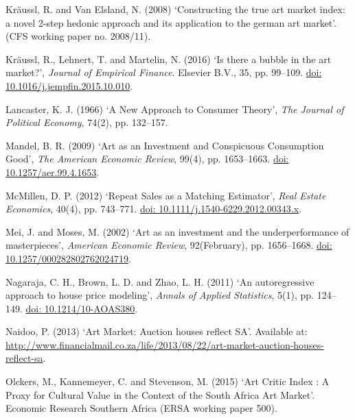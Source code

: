 \documentclass[12pt,]{article}
\begin{document}
Kräussl, R. and Van Elsland, N. (2008) `Constructing the true art market
index: a novel 2-step hedonic approach and its application to the german
art market'. (CFS working paper no. 2008/11).

Kräussl, R., Lehnert, T. and Martelin, N. (2016) `Is there a bubble in
the art market?', \emph{Journal of Empirical Finance}. Elsevier B.V.,
35, pp. 99--109.
\href{http://doi.org/10.1016/j.jempfin.2015.10.010}{doi: 10.1016/j.jempfin.2015.10.010}.

Lancaster, K. J. (1966) `A New Approach to Consumer Theory', \emph{The
Journal of Political Economy}, 74(2), pp. 132--157.

Mandel, B. R. (2009) `Art as an Investment and Conspicuous Consumption
Good', \emph{The American Economic Review}, 99(4), pp. 1653--1663.
\href{http://doi.org/10.1257/aer.99.4.1653}{doi: 10.1257/aer.99.4.1653}.

McMillen, D. P. (2012) `Repeat Sales as a Matching Estimator',
\emph{Real Estate Economics}, 40(4), pp. 743--771.
\href{http://doi.org/10.1111/j.1540-6229.2012.00343.x}{doi: 10.1111/j.1540-6229.2012.00343.x}.

Mei, J. and Moses, M. (2002) `Art as an investment and the
underperformance of masterpieces', \emph{American Economic Review},
92(February), pp. 1656--1668.
\href{http://doi.org/10.1257/000282802762024719}{doi: 10.1257/000282802762024719}.

Nagaraja, C. H., Brown, L. D. and Zhao, L. H. (2011) `An autoregressive
approach to house price modeling', \emph{Annals of Applied Statistics},
5(1), pp. 124--149.
\href{http://doi.org/10.1214/10-AOAS380}{doi: 10.1214/10-AOAS380}.

Naidoo, P. (2013) `Art Market: Auction houses reflect SA'. Available at:
\url{http://www.financialmail.co.za/life/2013/08/22/art-market-auction-houses-reflect-sa}.

Olckers, M., Kannemeyer, C. and Stevenson, M. (2015) `Art Critic Index :
A Proxy for Cultural Value in the Context of the South Africa Art
Market'. Economic Research Southern Africa (ERSA working paper 500).
\end{document}
